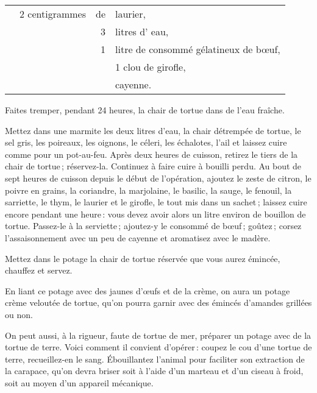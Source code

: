 \begin{longtable}{rrrrp{16em}}
  &   \multicolumn{2}{r}{2 centigrammes} & de & laurier,                                                  \\
  &     &              &  3 & litres d' eau,                                                              \\
  &     &              &  1 & litre de consommé gélatineux de bœuf,                                       \\
  &     &              &    & 1 clou de girofle,                                                          \\
  &     &              &    & cayenne.                                                                    \\
\end{longtable}
\normalsize                             

Faites tremper, pendant 24 heures, la chair de tortue dans de l'eau fraîche.

Mettez dans une marmite les deux litres d'eau, la chair détrempée de tortue, le
sel gris, les poireaux, les oignons, le céleri, les échalotes, l'ail et laissez
cuire comme pour un pot-au-feu. Après deux heures de cuisson, retirez le tiers
de la chair de tortue ; réservez-la. Continuez à faire cuire à bouilli perdu.
Au bout de sept heures de cuisson depuis le début de l'opération, ajoutez le
zeste de citron, le poivre en grains, la coriandre, la marjolaine, le basilic,
la sauge, le fenouil, la sarriette, le thym, le laurier et le girofle, le tout
mis dans un sachet ; laissez cuire encore pendant une heure : vous devez avoir
alors un litre environ de bouillon de tortue. Passez-le à la serviette ;
ajoutez-y le consommé de bœuf ; goûtez ; corsez l'assaisonnement avec un peu de
cayenne et aromatisez avec le madère.

Mettez dans le potage la chair de tortue réservée que vous aurez émincée,
chauffez et servez.

En liant ce potage avec des jaunes d'œufs et de la crème, on aura un potage
crème veloutée de tortue, qu'on pourra garnir avec des émincés d'amandes
grillées ou non.

\sk

On peut aussi, à la rigueur, faute de tortue de mer, préparer un potage avec de
la tortue de terre. Voici comment il convient d'opérer : coupez le cou d'une
tortue de terre, recueillez-en le sang. Ébouillantez l'animal pour faciliter
son extraction de la carapace, qu'on devra briser soit à l'aide d'un marteau et
d'un ciseau à froid, soit au moyen d'un appareil mécanique.

